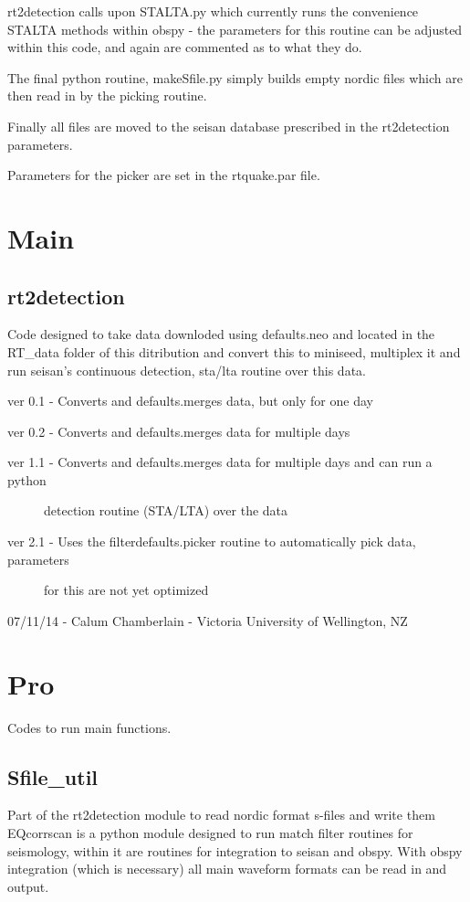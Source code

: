 \documentclass[letterpaper,10pt,english]{sphinxmanual}
\begin{document}
rt2detection calls upon STALTA.py which currently runs the convenience STALTA methods
within obspy - the parameters for this routine can be adjusted within this code, and
again are commented as to what they do.

The final python routine, makeSfile.py simply builds empty nordic files which are then
read in by the picking routine.

Finally all files are moved to the seisan database prescribed in the rt2detection parameters.

Parameters for the picker are set in the rtquake.par file.


\chapter{Main}
\label{modules:main}\label{modules::doc}

\section{rt2detection}
\label{modules:rt2detection}\label{modules:module-rt2detection}
Code designed to take data downloded using defaults.neo and located in the RT\_data
folder of this ditribution and convert this to miniseed, multiplex it and run
seisan's continuous detection, sta/lta routine over this data.

ver 0.1 - Converts and defaults.merges data, but only for one day

ver 0.2 - Converts and defaults.merges data for multiple days
\begin{description}
\item[{ver 1.1 - Converts and defaults.merges data for multiple days and can run a python}] \leavevmode
detection routine (STA/LTA) over the data

\item[{ver 2.1 - Uses the filterdefaults.picker routine to automatically pick data, parameters}] \leavevmode
for this are not yet optimized

\end{description}

07/11/14 - Calum Chamberlain - Victoria University of Wellington, NZ


\chapter{Pro}
\label{modules:pro}
Codes to run main functions.


\section{Sfile\_util}
\label{modules:module-Sfile_util}\label{modules:sfile-util}
Part of the rt2detection module to read nordic format s-files and write them
EQcorrscan is a python module designed to run match filter routines for
seismology, within it are routines for integration to seisan and obspy.
With obspy integration (which is necessary) all main waveform formats can be
read in and output.
\end{document}
